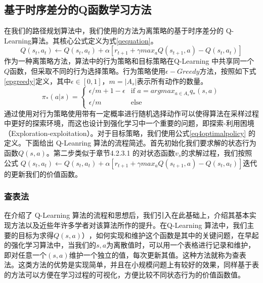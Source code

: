 \documentclass{standalone}
\begin{document}
\subsection{基于时序差分的Q函数学习方法}
在我们的路径规划算法中，我们使用的方法为离策略的基于时序差分的 Q-Learning算法。其核心公式定义为式\ref{qequation}。
    \begin{equation}
    \label{qequation}
        Q(s_t, a_t) \leftarrow Q(s_t, a_t) + \alpha[r_{t+1} + \gamma max_{a}Q(s_{t+1}, a) - Q(s_t, a_t)]
    \end{equation}
作为一种离策略方法，算法中的行为策略和目标策略在Q-Learning 中共享同一个$Q$函数，但采取不同的行为选择策略。行为策略使用$\epsilon-Greedy$方法，按照如下式\ref{epgreedy}定义，其中$\epsilon \in [0, 1]$，$m=|A_s|$表示所有动作的数量。
    \begin{equation}
    \label{epgreedy}
    \pi_{*}(a|s) = \begin{cases}
    \epsilon / m + 1 - \epsilon &\mbox{if $a = argmax_{a \in A_s}q_{*}(s, a)$}\\
    \epsilon / m &\mbox{else}
    \end{cases}
    \end{equation}
通过使用对行为策略使用带有一定概率进行随机选择动作可以使得算法在采样过程中更好的探索环境，而这也设计到强化学习中一个重要的问题，即探索-利用困境（Exploration-exploitation）。对于目标策略，我们使用公式\ref{eq4optimalpolicy} 的定义。下面给出 Q-Leanring 算法的流程简述。首先初始化我们要求解的状态行为函数$Q(s, a)$。第二步类似于章节4.2.3.1 的对状态函数$v_{s}$的求解过程，我们按照公式 $Q(s_t, a_t) \leftarrow Q(s_t, a_t) + \alpha[r_{t+1} + \gamma max_{a}Q(s_{t+1}, a) - Q(s_t, a_t)]$迭代的更新我们的价值函数。
\subsubsection{查表法}
在介绍了 Q-Learning 算法的流程和思想后，我们引入在此基础上，介绍其基本实现方法以及近些年许多学者对该算法所作的提升。在Q-Learning 算法中，我们主要的目标为求得$Q(s, a)）$，如何实现和维护这个函数是其中的关键问题，在早起的强化学习算法中，当我们的$s, a$为离散值时，可以用一个表格进行记录和维护，即对任意一个$(s, a)$维护一个独立的值，每次更新其值。这种方法就称为查表法。这类方法的优势是实现简单，并且在小规模问题上有较好的效果，同样基于表的方法可以方便在学习过程的可视化，方便比较不同状态行为的价值函数值。
\end{document}
